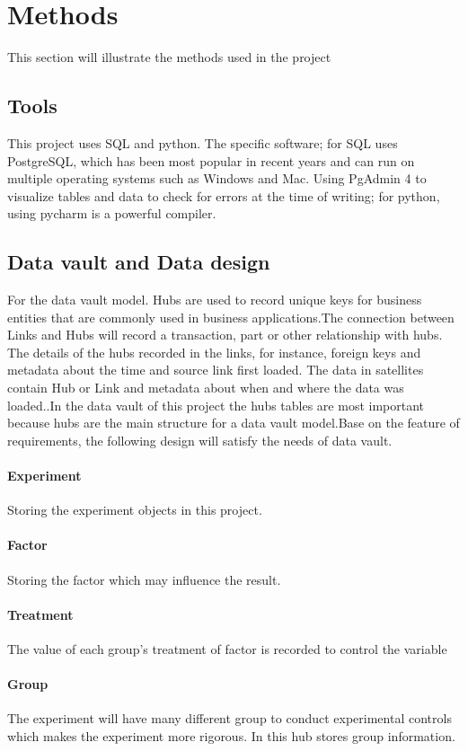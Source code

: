 \documentclass[conference]{IEEEtran}
\begin{document}
\section{Methods}
This section will illustrate the methods used in the project 
\subsection{Tools}\label{AA}
This project uses SQL and python. The specific software; for SQL uses PostgreSQL, which has been most popular in recent years and can run on multiple operating systems such as Windows and Mac. Using PgAdmin 4 to visualize tables and data to check for errors at the time of writing; for python, using pycharm is a powerful compiler.\\
\subsection{Data vault and Data design}
For the data vault model. Hubs are used to record unique keys for business entities that are commonly used in business applications.\cite{b4}The connection between Links and Hubs will record a transaction, part or other relationship with hubs. The details of the hubs recorded in the links, for instance, foreign keys and metadata about the time and source link first loaded. \cite{b5}The data in satellites contain Hub or Link and metadata about when and where the data was loaded.\cite{b6}.In the data vault of this project the hubs tables are most important because hubs are the main structure for a data vault model.Base on the feature of requirements, the following design will satisfy the needs of data vault.
\paragraph{Experiment} Storing the experiment objects in this project.
\paragraph{Factor} Storing the factor which may influence the result.
\paragraph{Treatment} The value of each group's treatment of factor is recorded to control the variable
\paragraph{Group} The experiment will have many different group to conduct experimental controls which makes the experiment more rigorous. In this hub stores group information.
\end{document}
